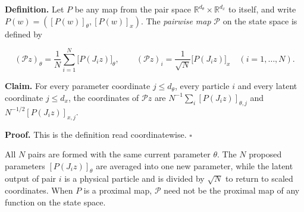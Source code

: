 \documentclass[11pt,a4paper]{article}
\begin{document}
\textbf{Definition.} Let \(P\) be any map from the pair space \(\mathbb R^{d_\theta}\times\mathbb R^{d_x}\) to itself, and write \(P(w)=([P(w)]_\theta,[P(w)]_x)\). The \emph{pairwise map} \(\mathcal P\) on the state space is defined by


\[(\mathcal Pz)_\theta=\frac1N\sum_{i=1}^N\bigl[P(J_iz)\bigr]_\theta,\qquad(\mathcal Pz)_i=\frac1{\sqrt N}\bigl[P(J_iz)\bigr]_x\quad(i=1,\dots,N).\]


\textbf{Claim.} For every parameter coordinate \(j\le d_\theta\), every particle \(i\) and every latent coordinate \(j\le d_x\), the coordinates of \(\mathcal Pz\) are \(N^{-1}\sum_i[P(J_iz)]_{\theta,j}\) and \(N^{-1/2}[P(J_iz)]_{x,j}\).




\textbf{Proof.} This is the definition read coordinatewise. \(\square\)




All \(N\) pairs are formed with the same current parameter \(\theta\). The \(N\) proposed parameters \([P(J_iz)]_\theta\) are averaged into one new parameter, while the latent output of pair \(i\) is a physical particle and is divided by \(\sqrt N\) to return to scaled coordinates. When \(P\) is a proximal map, \(\mathcal P\) need not be the proximal map of any function on the state space.
\end{document}
